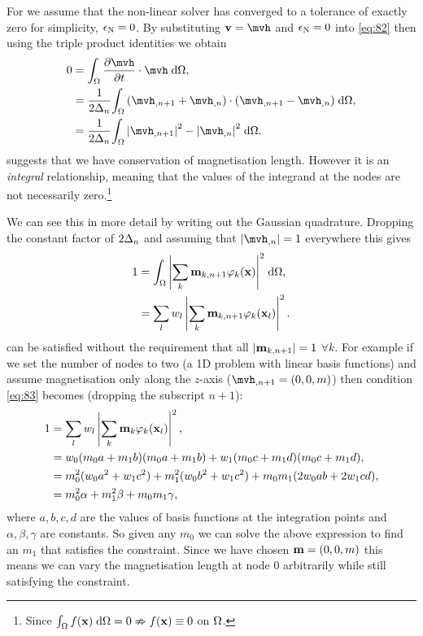 For  we assume that the non-linear solver has converged to a tolerance of exactly zero for simplicity, \ie $\epsilon_{\mathrm{N}} = 0$.
By substituting $\testv = \mvh$ and $\epsilon_{\mathrm{N}} = 0$ into \cref{eq:82} then using the triple product identities we obtain
\begin{equation}
  \label{eq:23}
  \begin{aligned}
    0 &= \ipg{\dmdth}{\mvh}, \\
    &= \frac{1}{2\dtn} \intd{(\mvh_{,n+1} + \mvh_{,n}) \cdot (\mvh_{,n+1} - \mvh_{,n})}, \\
    &= \frac{1}{2\dtn} \intd{\abs{\mvh_{,n+1}}^2 - \abs{\mvh_{,n}}^2}.
  \end{aligned}
\end{equation}
 suggests that we have conservation of magnetisation length.
However it is an \emph{integral} relationship, meaning that the values of the integrand at the nodes are not necessarily zero.\footnote{Since ${\int_{\Omega} { f(\boldsymbol{\mathrm{x}})} {\; \mathrm{{d}}} {\Omega}} = 0 \nRightarrow f(\boldsymbol{\mathrm{x}}) \equiv 0$ on $\Omega$.}

We can see this in more detail by writing out the Gaussian quadrature.
Dropping the constant factor of $2\Delta_{n}$ and assuming that $\abs{\mvh_{,n}} = 1$ everywhere this gives
\begin{equation}
  \begin{aligned}
    1 &= {\int_{\Omega} {\left|{\sum_k \boldsymbol{\mathrm{m}}_{k, n+1} \varphi_k(\boldsymbol{\mathrm{x}})} \right|^2} {\; \mathrm{{d}}} {\Omega}}, \\
    &= \sum_l w_l \left|{\sum_k \boldsymbol{\mathrm{m}}_{k, n+1} \varphi_k(\boldsymbol{\mathrm{x}}_l)} \right|^2.
    \label{eq:83}
  \end{aligned}
\end{equation}
 can be satisfied without the requirement that all $\left|{\boldsymbol{\mathrm{m}}_{k, n+1}} \right| = 1$ $\forall k$.
For example if we set the number of nodes to two (\ie a 1D problem with linear basis functions) and assume magnetisation only along the $z$-axis (\ie  $\mvh_{,n+1} = (0, 0, m)$) then condition \cref{eq:83} becomes (dropping the subscript $n+1$):
\begin{equation}
  \begin{aligned}
    1 &= \sum_l w_l \left|{\sum_k \boldsymbol{\mathrm{m}}_{k} \varphi_k(\boldsymbol{\mathrm{x}}_l)} \right|^2, \\
    &= w_0 (m_{0} a + m_{1} b)(m_{0} a + m_{1} b) + w_1 (m_{0} c + m_{1} d)(m_{0} c + m_{1} d), \\
    &= m_{0}^2 (w_0 a^2 + w_1 c^2) + m_{1}^2 (w_0 b^2 + w_1 c^2) + m_{0} m_{1} (2w_0ab + 2w_1cd), \\
    &= m_{0}^2 \alpha + m_{1}^2 \beta + m_{0} m_{1} \gamma, \\
  \end{aligned}
\end{equation}
where $a,b,c,d$ are the values of basis functions at the integration points and $\alpha, \beta, \gamma$ are constants.
So given any $m_{0}$ we can solve the above expression to find an $m_{1}$ that satisfies the constraint.
Since we have chosen $\boldsymbol{\mathrm{m}} = (0, 0, m)$ this means we can vary the magnetisation length at node 0 arbitrarily while still satisfying the constraint.

